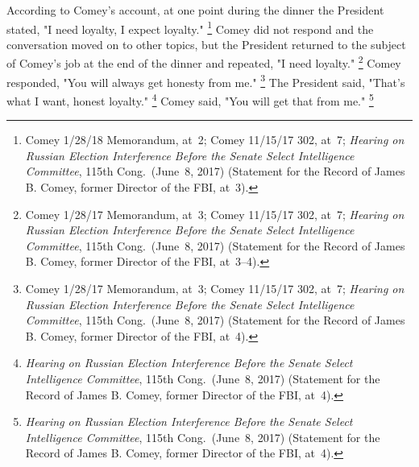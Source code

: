 According to Comey's account, at one point during the dinner the President stated, "I need loyalty, I expect loyalty."%
\footnote{Comey 1/28/18 Memorandum, at~2;
Comey 11/15/17 302, at~7;
\textit{Hearing on Russian Election Interference Before the Senate Select Intelligence Committee}, 115th Cong.\ (June~8, 2017) (Statement for the Record of James B. Comey, former Director of the FBI, at~3).}
Comey did not respond and the conversation moved on to other topics, but the President returned to the subject of Comey's job at the end of the dinner and repeated, "I need loyalty."%
\footnote{Comey 1/28/17 Memorandum, at~3;
Comey 11/15/17 302, at~7;
\textit{Hearing on Russian Election Interference Before the Senate Select Intelligence Committee}, 115th Cong.\ (June~8, 2017) (Statement for the Record of James B. Comey, former Director of the FBI, at~3--4).}
Comey responded, "You will always get honesty from me."%
\footnote{Comey 1/28/17 Memorandum, at~3;
Comey 11/15/17 302, at~7;
\textit{Hearing on Russian Election Interference Before the Senate Select Intelligence Committee}, 115th Cong.\ (June~8, 2017) (Statement for the Record of James B. Comey, former Director of the FBI, at~4).}
The President said, "That's what I want, honest loyalty."%
\footnote{\textit{Hearing on Russian Election Interference Before the Senate Select Intelligence Committee}, 115th Cong.\ (June~8, 2017) (Statement for the Record of James B. Comey, former Director of the FBI, at~4).}
Comey said, "You will get that from me."%
\footnote{\textit{Hearing on Russian Election Interference Before the Senate Select Intelligence Committee}, 115th Cong.\ (June~8, 2017) (Statement for the Record of James B. Comey, former Director of the FBI, at~4).}

